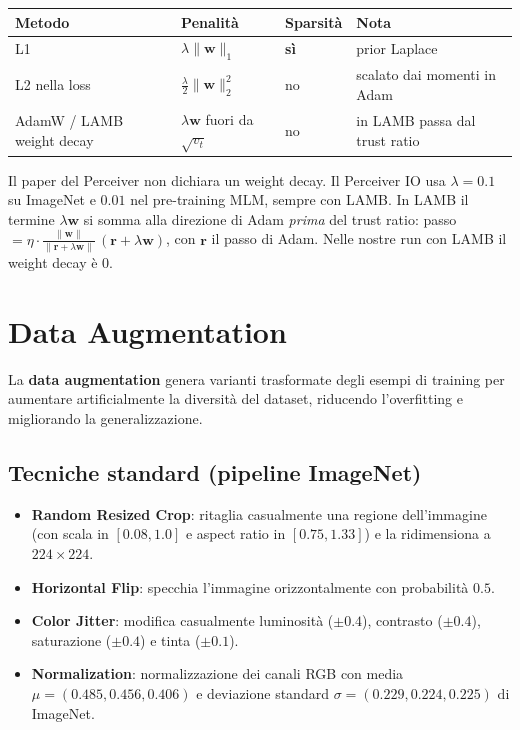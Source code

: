 \documentclass[
  11pt,
]{article}
\begin{document}
\begin{center}
\begin{tabular}{llll}
\toprule
\textbf{Metodo} & \textbf{Penalità} & \textbf{Sparsità} & \textbf{Nota} \\
\midrule
L1 & $\lambda\|\mathbf{w}\|_1$ & \textbf{sì} & prior Laplace \\
L2 nella loss & $\tfrac{\lambda}{2}\|\mathbf{w}\|_2^2$ & no & scalato dai momenti in Adam \\
AdamW / LAMB weight decay & $\lambda \mathbf{w}$ fuori da $\sqrt{v_t}$ & no & in LAMB passa dal trust ratio \\
\bottomrule
\end{tabular}
\end{center}

\begin{notabox}[title={\textbf{Collegamento al Perceiver}}]
Il paper del Perceiver non dichiara un weight decay. Il Perceiver IO usa $\lambda = 0.1$ su ImageNet e $0.01$ nel pre-training MLM, sempre con LAMB. In LAMB il termine $\lambda \mathbf{w}$ si somma alla direzione di Adam \emph{prima} del trust ratio: passo $= \eta \cdot \frac{\|\mathbf{w}\|}{\|\mathbf{r} + \lambda \mathbf{w}\|}\,(\mathbf{r} + \lambda \mathbf{w})$, con $\mathbf{r}$ il passo di Adam. Nelle nostre run con LAMB il weight decay è 0.
\end{notabox}

\section{Data Augmentation}
\label{app:data-aug}

La \textbf{data augmentation} genera varianti trasformate degli esempi di training per aumentare artificialmente la diversità del dataset, riducendo l'overfitting e migliorando la generalizzazione.

\subsection{Tecniche standard (pipeline ImageNet)}

\begin{itemize}
  \item \textbf{Random Resized Crop}: ritaglia casualmente una regione dell'immagine (con scala in $[0.08, 1.0]$ e aspect ratio in $[0.75, 1.33]$) e la ridimensiona a $224\times224$.
  \item \textbf{Horizontal Flip}: specchia l'immagine orizzontalmente con probabilità $0.5$.
  \item \textbf{Color Jitter}: modifica casualmente luminosità ($\pm 0.4$), contrasto ($\pm 0.4$), saturazione ($\pm 0.4$) e tinta ($\pm 0.1$).
  \item \textbf{Normalization}: normalizzazione dei canali RGB con media $\mu=(0.485, 0.456, 0.406)$ e deviazione standard $\sigma=(0.229, 0.224, 0.225)$ di ImageNet.
\end{itemize}
\end{document}
